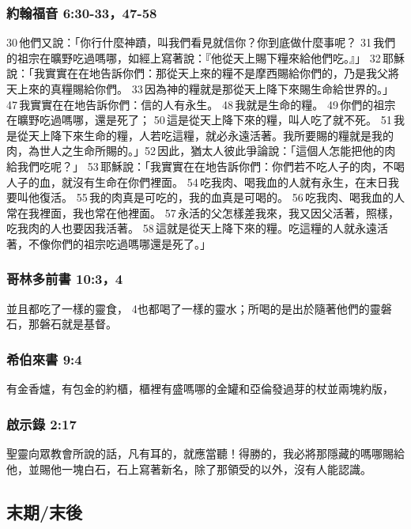 \subsubsection{約翰福音 6:30-33，47-58}
30 他們又說：「你行什麼神蹟，叫我們看見就信你？你到底做什麼事呢？ 31 我們的祖宗在曠野吃過嗎哪，如經上寫著說：『他從天上賜下糧來給他們吃。』」 32 耶穌說：「我實實在在地告訴你們：那從天上來的糧不是摩西賜給你們的，乃是我父將天上來的真糧賜給你們。 33 因為神的糧就是那從天上降下來賜生命給世界的。」 47 我實實在在地告訴你們：信的人有永生。 48 我就是生命的糧。 49 你們的祖宗在曠野吃過嗎哪，還是死了； 50 這是從天上降下來的糧，叫人吃了就不死。 51 我是從天上降下來生命的糧，人若吃這糧，就必永遠活著。我所要賜的糧就是我的肉，為世人之生命所賜的。」52 因此，猶太人彼此爭論說：「這個人怎能把他的肉給我們吃呢？」 53 耶穌說：「我實實在在地告訴你們：你們若不吃人子的肉，不喝人子的血，就沒有生命在你們裡面。 54 吃我肉、喝我血的人就有永生，在末日我要叫他復活。 55 我的肉真是可吃的，我的血真是可喝的。 56 吃我肉、喝我血的人常在我裡面，我也常在他裡面。 57 永活的父怎樣差我來，我又因父活著，照樣，吃我肉的人也要因我活著。 58 這就是從天上降下來的糧。吃這糧的人就永遠活著，不像你們的祖宗吃過嗎哪還是死了。」

\subsubsection{哥林多前書 10:3，4}
並且都吃了一樣的靈食， 4也都喝了一樣的靈水；所喝的是出於隨著他們的靈磐石，那磐石就是基督。

\subsubsection{希伯來書 9:4}
有金香爐，有包金的約櫃，櫃裡有盛嗎哪的金罐和亞倫發過芽的杖並兩塊約版，

\subsubsection{啟示錄 2:17}
聖靈向眾教會所說的話，凡有耳的，就應當聽！得勝的，我必將那隱藏的嗎哪賜給他，並賜他一塊白石，石上寫著新名，除了那領受的以外，沒有人能認識。





\subsection{末期/末後}
